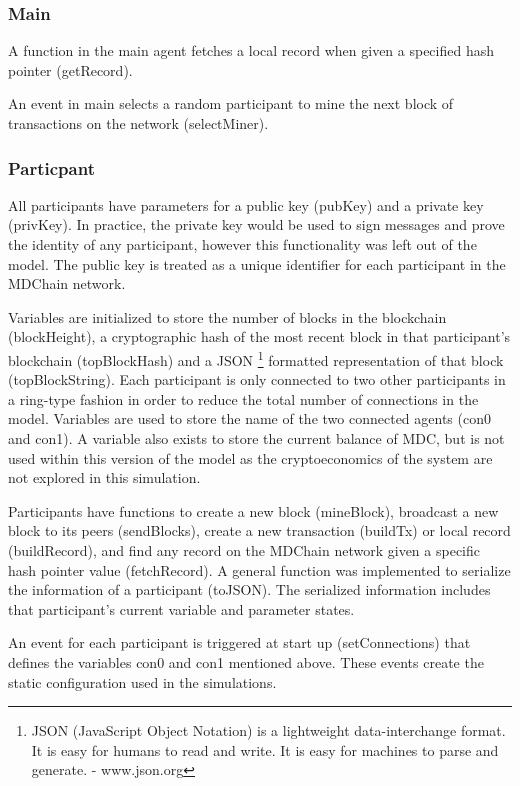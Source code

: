 \documentclass[12pt]{report}
\begin{document}
\subsubsection{Main}
A function in the main agent fetches a local record when given a specified hash pointer (getRecord).

An event in main selects a random participant to mine the next block of transactions on the network (selectMiner).

\subsubsection{Particpant}
All participants have parameters for a public key (pubKey) and a private key (privKey). In practice, the private key would be used to sign messages and prove the identity of any participant, however this functionality was left out of the model. The public key is treated as a unique identifier for each participant in the MDChain network.

Variables are initialized to store the number of blocks in the blockchain (blockHeight), a cryptographic hash of the most recent block in that participant's blockchain (topBlockHash) and a JSON \footnote{JSON (JavaScript Object Notation) is a lightweight data-interchange format. It is easy for humans to read and write. It is easy for machines to parse and generate. - www.json.org} formatted representation of that block (topBlockString). Each participant is only connected to two other participants in a ring-type fashion in order to reduce the total number of connections in the model. Variables are used to store the name of the two connected agents (con0 and con1). A variable also exists to store the current balance of MDC, but is not used within this version of the model as the cryptoeconomics of the system are not explored in this simulation.

Participants have functions to create a new block (mineBlock), broadcast a new block to its peers (sendBlocks), create a new transaction (buildTx) or local record (buildRecord), and find any record on the MDChain network given a specific hash pointer value (fetchRecord). A general function was implemented to serialize the  information of a participant (toJSON). The serialized information includes that participant's current variable and parameter states.

An event for each participant is triggered at start up (setConnections) that defines the variables con0 and con1 mentioned above. These events create the static configuration used in the simulations.
\end{document}
